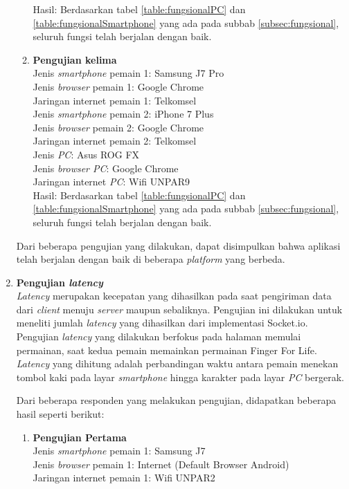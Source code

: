\begin{enumerate}
\begin{enumerate}
		Hasil: Berdasarkan tabel \ref{table:fungsionalPC} dan \ref{table:fungsionalSmartphone} yang ada pada subbab \ref{subsec:fungsional}, seluruh fungsi telah berjalan dengan baik.
		
		\item \textbf{Pengujian kelima} \\
		Jenis \textit{smartphone} pemain 1: Samsung J7 Pro\\
		Jenis \textit{browser} pemain 1: Google Chrome\\
		Jaringan internet pemain 1: Telkomsel\\
		
		Jenis \textit{smartphone} pemain 2: iPhone 7 Plus\\
		Jenis \textit{browser} pemain 2: Google Chrome\\
		Jaringan internet pemain 2: Telkomsel\\
		
		Jenis \textit{PC}: Asus ROG FX\\
		Jenis \textit{browser PC}: Google Chrome\\
		Jaringan internet \textit{PC}: Wifi UNPAR9\\
		
		Hasil: Berdasarkan tabel \ref{table:fungsionalPC} dan \ref{table:fungsionalSmartphone} yang ada pada subbab \ref{subsec:fungsional}, seluruh fungsi telah berjalan dengan baik.
	\end{enumerate}

	Dari beberapa pengujian yang dilakukan, dapat disimpulkan bahwa aplikasi telah berjalan dengan baik di beberapa \textit{platform} yang berbeda.
	
	
	\item \textbf{Pengujian \textit{latency}} \\
	\textit{Latency} merupakan kecepatan yang dihasilkan pada saat pengiriman data dari \textit{client} menuju \textit{server} maupun sebaliknya. Pengujian ini dilakukan untuk meneliti jumlah \textit{latency} yang dihasilkan dari implementasi Socket.io. Pengujian \textit{latency} yang dilakukan berfokus pada halaman memulai permainan, saat kedua pemain memainkan permainan Finger For Life. \textit{Latency} yang dihitung adalah perbandingan waktu antara pemain menekan tombol kaki pada layar \textit{smartphone} hingga karakter pada layar \textit{PC} bergerak. 
	
	Dari beberapa responden yang melakukan pengujian, didapatkan beberapa hasil seperti berikut:
	
	\begin{enumerate}
		\item \textbf{Pengujian Pertama} \\ 
		Jenis \textit{smartphone} pemain 1: Samsung J7\\
		Jenis \textit{browser} pemain 1: Internet (Default Browser Android)\\
		Jaringan internet pemain 1: Wifi UNPAR2\\
		

\end{enumerate}
\end{enumerate}
